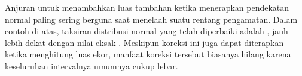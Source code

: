 Anjuran untuk menambahkan luas tambahan ketika menerapkan pendekatan
normal paling sering berguna saat menelaah suatu rentang pengamatan.
Dalam contoh di atas, taksiran distribusi normal yang telah diperbaiki
adalah \smokeABCNormalFixed{}, jauh lebih dekat dengan nilai eksak
\smokeABCBinom{}. Meskipun koreksi ini juga dapat diterapkan ketika
menghitung luas ekor, manfaat koreksi tersebut biasanya hilang karena
keseluruhan intervalnya umumnya cukup lebar.



{}




